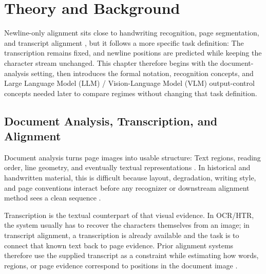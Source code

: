 
\chapter{Theory and Background}
\label{cha:theory_background}

Newline-only alignment sits close to handwriting recognition, page segmentation, and transcript alignment , but it follows a more specific task definition: The transcription remains fixed, and newline positions are predicted while keeping the character stream unchanged. This chapter therefore begins with the document-analysis setting, then introduces the formal notation, recognition concepts, and Large Language Model (LLM) / Vision-Language Model (VLM) output-control concepts needed later to compare regimes without changing that task definition.

\section{Document Analysis, Transcription, and Alignment}
\label{sec:theory_task_context}

Document analysis turns page images into usable structure: Text regions, reading order, line geometry, and eventually textual representations . In historical and handwritten material, this is difficult because layout, degradation, writing style, and page conventions interact before any recognizer or downstream alignment method sees a clean sequence .

Transcription is the textual counterpart of that visual evidence. In OCR/HTR, the system usually has to recover the characters themselves from an image; in transcript alignment, a transcription is already available and the task is to connect that known text back to page evidence. Prior alignment systems therefore use the supplied transcript as a constraint while estimating how words, regions, or page evidence correspond to positions in the document image .

